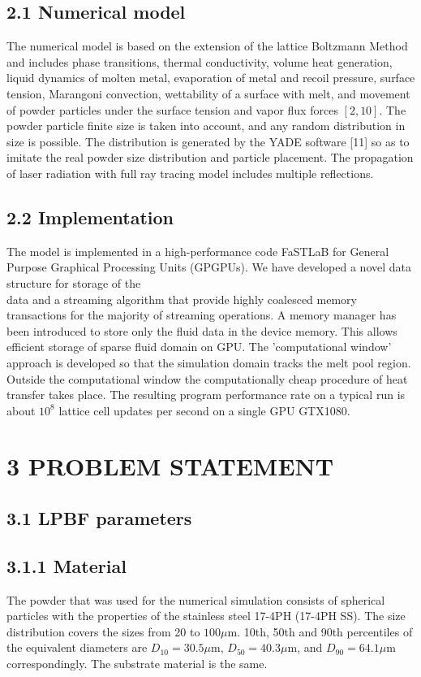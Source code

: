 \documentclass[10pt]{article}
\begin{document}
\subsection*{2.1 Numerical model}
The numerical model is based on the extension of the lattice Boltzmann Method and includes phase transitions, thermal conductivity, volume heat generation, liquid dynamics of molten metal, evaporation of metal and recoil pressure, surface tension, Marangoni convection, wettability of a surface with melt, and movement of powder particles under the surface tension and vapor flux forces $[2,10]$. The powder particle finite size is taken into account, and any random distribution in size is possible. The distribution is generated by the YADE software [11] so as to imitate the real powder size distribution and particle placement. The propagation of laser radiation with full ray tracing model includes multiple reflections.

\subsection*{2.2 Implementation}
The model is implemented in a high-performance code FaSTLaB for General Purpose Graphical Processing Units (GPGPUs). We have developed a novel data structure for storage of the\\
data and a streaming algorithm that provide highly coalesced memory transactions for the majority of streaming operations. A memory manager has been introduced to store only the fluid data in the device memory. This allows efficient storage of sparse fluid domain on GPU. The 'computational window' approach is developed so that the simulation domain tracks the melt pool region. Outside the computational window the computationally cheap procedure of heat transfer takes place. The resulting program performance rate on a typical run is about $10^{8}$ lattice cell updates per second on a single GPU GTX1080.

\section*{3 PROBLEM STATEMENT}
\subsection*{3.1 LPBF parameters}
\subsection*{3.1.1 Material}
The powder that was used for the numerical simulation consists of spherical particles with the properties of the stainless steel 17-4PH (17-4PH SS). The size distribution covers the sizes from 20 to $100 \mu \mathrm{m}$. 10th, 50th and 90th percentiles of the equivalent diameters are $D_{10}=30.5 \mu \mathrm{m}$, $D_{50}=40.3 \mu \mathrm{m}$, and $D_{90}=64.1 \mu \mathrm{m}$ correspondingly. The substrate material is the same.
\end{document}
